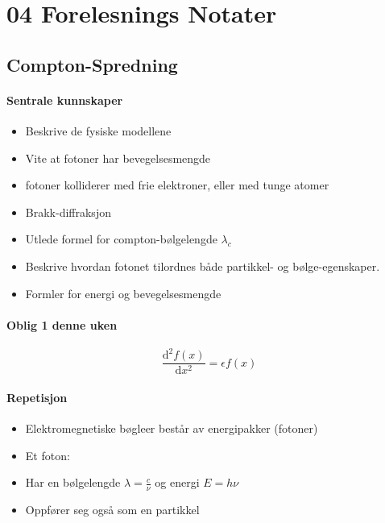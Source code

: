 \chapter{04 Forelesnings Notater}
\section{Compton-Spredning}
\subsubsection{Sentrale kunnskaper}
\begin{itemize}
    \item Beskrive de fysiske modellene
    \item Vite at fotoner har bevegelsesmengde
    \item fotoner kolliderer med frie elektroner, eller med tunge atomer 
    \item Brakk-diffraksjon
    \item Utlede formel for compton-bølgelengde $λ_c$
    \item Beskrive hvordan fotonet tilordnes både partikkel- og bølge-egenskaper. 
    \item Formler for energi og bevegelsesmengde 
\end{itemize}

\subsubsection*{Oblig 1 denne uken}
\[
\frac{\mathrm{d}^{2}f(x)}{\mathrm{d}x^{2}} = ϵ f(x)
\]
\subsubsection*{Repetisjon}
\begin{itemize}
    \item Elektromegnetiske bøgleer består av energipakker (fotoner)
    \item 
    Et foton:
    \item Har en bølgelengde $λ = \frac{c}{ν}$ og energi $E = hν$
    \item Oppfører seg også som en partikkel
\end{itemize}
  
  
